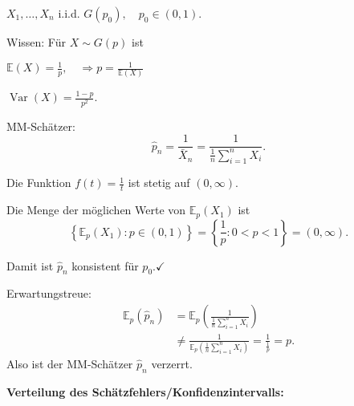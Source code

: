 \documentclass{tstextbook}
\DeclareMathOperator{\Var}{Var}
\newcommand{\E}{\mathbb E}
\begin{document}
\begin{example}
	$ X_1, \ldots, X_n $ i.i.d. $ G(p_0), \quad p_0 \in (0,1) $.
	
	Wissen: Für $ X \sim G(p) $ ist 
	
	$ \E(X) = \frac{1}{p}, \quad \Rightarrow p = \frac{1}{\E(X)} $
	
	$ \Var(X) = \frac{1-p}{p^2} $.
	
	MM-Schätzer: 
	\[
	\hat{p}_n = \frac{1}{\bar{X}_n} = \frac{1}{\frac{1}{n} \sum_{i=1}^{n} X_i}.
	\]
	
	Die Funktion $ f(t) = \frac{1}{t} $ ist stetig auf $ (0,\infty) $. 
	
	Die Menge der möglichen Werte von $ \E_p(X_1) $ ist \[ \left\lbrace \E_p (X_1) \colon p\in (0,1) \right\rbrace = \left\lbrace \frac{1}{p} \colon 0<p<1 \right\rbrace = (0, \infty). \]
	
	Damit ist $ \hat{p}_n $ konsistent für $ p_0 . \checkmark $
	
	Erwartungstreue: 
	\[
	\begin{aligned}
		\E_p(\hat{p}_n)  & = \E_p \left( \frac{1}{\frac{1}{n}\sum_{i=1}^{n}X_i} \right) \\
		& \ne \frac{1}{\E_p\left(\frac{1}{n}\sum_{i=1}^{n}X_i \right) } = \frac{1}{\frac{1}{p}} = p.
	\end{aligned}
	\]
	Also ist der MM-Schätzer $ \hat{p}_n $ verzerrt.
\end{example}

\textbf{Verteilung des Schätzfehlers/Konfidenzintervalls:}
\end{document}
